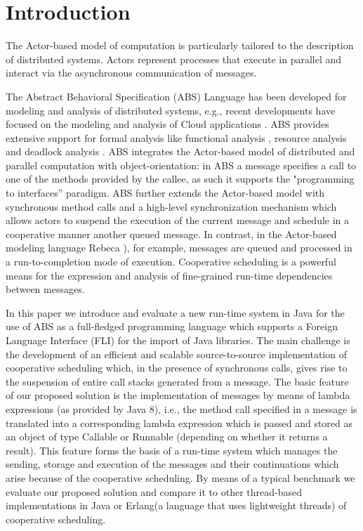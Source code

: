 \section{Introduction}

The Actor-based model of computation \cite{Agha} is particularly tailored to the description of distributed systems. Actors represent processes that execute in parallel and interact via the asynchronous communication of messages.


The Abstract Behavioral Specification (ABS) \cite{abs} Language has been developed
for modeling and analysis of distributed systems, e.g., recent developments
have focused on the modeling and analysis of Cloud applications \cite{Albert}.
ABS provides extensive support for formal analysis like functional analysis \cite{KeY}, resource analysis \cite{saco} and deadlock analysis \cite{dead}.
 ABS integrates the Actor-based model of distributed and parallel computation with object-orientation:
in ABS a message specifies a call to one of the methods provided by the callee,
as such it supports the "programming to interfaces'' paradigm.
ABS further extends the Actor-based model with synchronous method calls and a high-level synchronization mechanism which allows actors to suspend the
execution of the current message and schedule in a cooperative manner another
queued message. 
In contrast, in the Actor-based modeling language Rebeca \cite{Sirjani}), for example,
messages are queued and processed in a run-to-completion mode of execution.
Cooperative scheduling is a powerful means for the expression and analysis
of fine-grained run-time dependencies between messages.



In this paper we introduce and evaluate a new run-time system in Java for the use of ABS as a full-fledged programming language which supports a Foreign Language Interface (FLI) for the import of Java libraries. 
The main challenge is the development of an efficient and scalable source-to-source implementation of cooperative scheduling which, in the presence of synchronous calls, gives rise to the suspension of entire call stacks generated from a message.
The basic feature of our proposed solution is the implementation of messages by means of lambda expressions (as provided by Java 8), i.e., the method call specified in a message
is translated into a corresponding lambda expression \cite{lambdas} which is passed and stored as
an object of type Callable or Runnable (depending on whether it returns a result).
This feature forms the basis of a run-time system which manages
the sending, storage and execution of the messages and their continuations
which arise because of the cooperative scheduling.
By means of a typical benchmark we evaluate our proposed solution and compare it
to other thread-based implementations in Java or Erlang(a language that uses lightweight threads) of cooperative scheduling.

